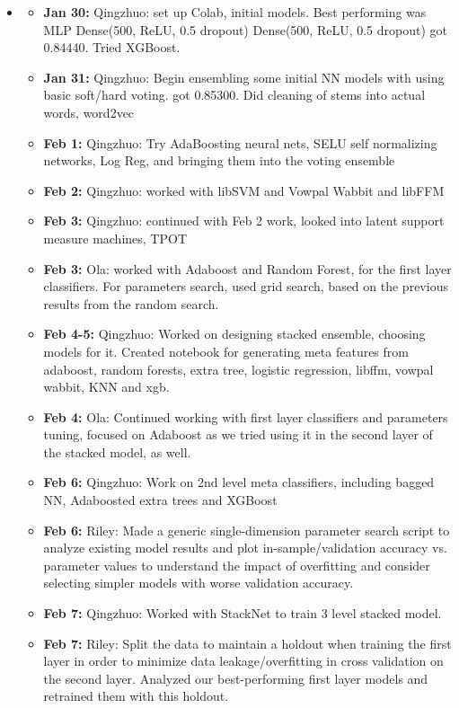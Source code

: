 \begin{itemize}
    \item {}
    \begin{itemize}
    \item \textbf{Jan 30:} Qingzhuo: set up Colab, initial models. Best performing was MLP Dense(500, ReLU, 0.5 dropout) Dense(500, ReLU, 0.5 dropout) got 0.84440. Tried XGBoost.
    \item \textbf{Jan 31:} Qingzhuo: Begin ensembling some initial NN models with using basic soft/hard voting. got 0.85300. Did cleaning of stems into actual words, word2vec
    \item \textbf{Feb 1:} Qingzhuo: Try AdaBoosting neural nets, SELU self normalizing networks, Log Reg, and bringing them into the voting ensemble
    \item \textbf{Feb 2:} Qingzhuo: worked with libSVM and Vowpal Wabbit and libFFM
    \item \textbf{Feb 3:} Qingzhuo: continued with Feb 2 work, looked into latent support measure machines, TPOT
    \item \textbf{Feb 3:} Ola: worked with Adaboost and Random Forest, for the first layer classifiers. For parameters search, used grid search, based on the previous results from the random search.
    \item \textbf{Feb 4-5:} Qingzhuo: Worked on designing stacked ensemble, choosing models for it. Created notebook for generating meta features from adaboost, random forests, extra tree, logistic regression, libffm, vowpal  wabbit, KNN and xgb.
    \item \textbf{Feb 4:} Ola: Continued working with first layer classifiers and parameters tuning, focused on Adaboost as we tried using it in the second layer of the stacked model, as well.
    \item \textbf{Feb 6:} Qingzhuo: Work on 2nd level meta classifiers, including bagged NN, Adaboosted extra trees and XGBoost
    \item \textbf{Feb 6:} Riley: Made a generic single-dimension parameter search script to analyze existing model results and plot in-sample/validation accuracy vs. parameter values to understand the impact of overfitting and consider selecting simpler models with worse validation accuracy.
    \item \textbf{Feb 7:} Qingzhuo: Worked with StackNet to train 3 level stacked model.
    \item \textbf{Feb 7:} Riley: Split the data to maintain a holdout when training the first layer in order to minimize data leakage/overfitting in cross validation on the second layer. Analyzed our best-performing first layer models and retrained them with this holdout.

\end{itemize}
\end{itemize}
